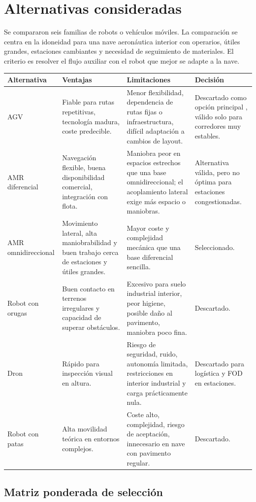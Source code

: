 \chapter{Alternativas consideradas}

Se compararon seis familias de robots o vehículos móviles. La comparación se centra en la idoneidad para una nave aeronáutica interior con operarios, útiles grandes, estaciones cambiantes y necesidad de seguimiento de materiales. El criterio es resolver el flujo auxiliar con el robot que mejor se adapte a la nave.

\begin{longtable}{P{0.20\textwidth}P{0.30\textwidth}P{0.18\textwidth}P{0.22\textwidth}}
\toprule
Alternativa & Ventajas & Limitaciones & Decisión\\
\midrule
\endhead
AGV & Fiable para rutas repetitivas, tecnología madura, coste predecible. & Menor flexibilidad, dependencia de rutas fijas o infraestructura, difícil adaptación a cambios de layout. & Descartado como opción principal , válido solo para corredores muy estables.\\
AMR diferencial & Navegación flexible, buena disponibilidad comercial, integración con flota. & Maniobra peor en espacios estrechos que una base omnidireccional; el acoplamiento lateral exige más espacio o maniobras. & Alternativa válida, pero no óptima para estaciones congestionadas.\\
AMR omnidireccional & Movimiento lateral, alta maniobrabilidad y buen trabajo cerca de estaciones y útiles grandes. & Mayor coste y complejidad mecánica que una base diferencial sencilla. & Seleccionado.\\
Robot con orugas & Buen contacto en terrenos irregulares y capacidad de superar obstáculos. & Excesivo para suelo industrial interior, peor higiene, posible daño al pavimento, maniobra poco fina. & Descartado.\\
Dron & Rápido para inspección visual en altura. & Riesgo de seguridad, ruido, autonomía limitada, restricciones en interior industrial y carga prácticamente nula. & Descartado para logística y FOD en estaciones.\\
Robot con patas & Alta movilidad teórica en entornos complejos. & Coste alto, complejidad, riesgo de aceptación, innecesario en nave con pavimento regular. & Descartado.\\
\bottomrule
\end{longtable}

\section{Matriz ponderada de selección}

